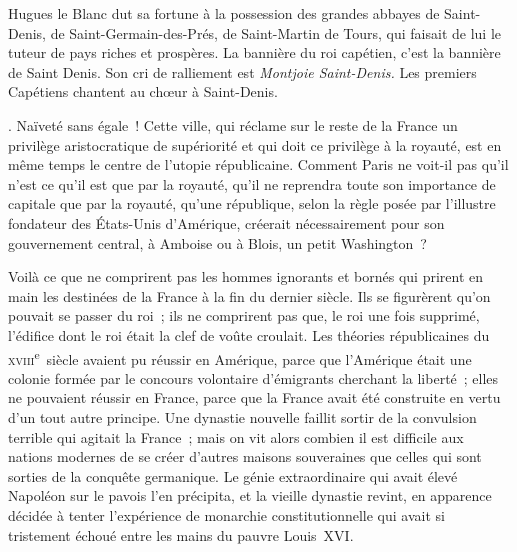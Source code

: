 \documentclass[french,twoside]{book} %
\newcommand{\bibl}[1]{{\RaggedLeft{#1}\par\bigskip}}
\begin{document}
{\bibl{(Roman de Roncevaux, laisse 40. ) }
\par
 \noindent Hugues le Blanc dut sa fortune à la possession des grandes abbayes de Saint-Denis, de Saint-Germain-des-Prés, de Saint-Martin de Tours, qui faisait de lui le tuteur de pays riches et prospères. La bannière du roi capétien, c’est la bannière de Saint Denis. Son cri de ralliement est {\itshape Montjoie Saint-Denis.} Les premiers Capétiens chantent au chœur à Saint-Denis.
 }. Naïveté sans égale ! Cette ville, qui réclame sur le reste de la France un privilège aristocratique de supériorité et qui doit ce privilège à la royauté, est en même temps le centre de l’utopie républicaine. Comment Paris ne voit-il pas qu’il n’est ce qu’il est que par la royauté, qu’il ne reprendra toute son importance de capitale que par la royauté, qu’une république, selon la règle posée par l’illustre fondateur des États-Unis d’Amérique, créerait nécessairement pour son gouvernement central, à Amboise ou à Blois, un petit Washington ? \par
Voilà ce que ne comprirent pas les hommes ignorants et bornés qui prirent en main les destinées de la France à la fin du dernier siècle. Ils se figurèrent qu’on pouvait se passer du roi ; ils ne comprirent pas que, le roi une fois supprimé, l’édifice dont le roi était la clef de voûte croulait. Les théories républicaines du \textsc{xviii}\textsuperscript{e} siècle avaient pu réussir en Amérique, parce que l’Amérique était une colonie formée par le concours volontaire d’émigrants cherchant la liberté ; elles ne pouvaient réussir en France, parce que la France avait été construite en vertu d’un tout autre principe. Une dynastie nouvelle faillit sortir de la convulsion terrible qui agitait la France ; mais on vit alors combien il est difficile aux nations modernes de se créer d’autres maisons souveraines que celles qui sont sorties de la conquête germanique. Le génie extraordinaire qui avait élevé Napoléon sur le pavois l’en précipita, et la vieille dynastie revint, en apparence décidée à tenter l’expérience de monarchie constitutionnelle qui avait si tristement échoué entre les mains du pauvre Louis XVI.\par
\end{document}
